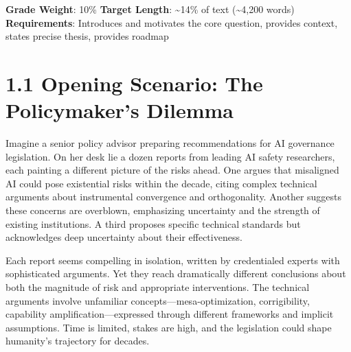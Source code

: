 \documentclass[
  11pt,
  letterpaper,
]{book}
\begin{document}
\begin{tcolorbox}[enhanced jigsaw, opacitybacktitle=0.6, colbacktitle=quarto-callout-note-color!10!white, toptitle=1mm, colback=white, breakable, left=2mm, bottomrule=.15mm, title=\textcolor{quarto-callout-note-color}{\faInfo}\hspace{0.5em}{Chapter Overview}, rightrule=.15mm, arc=.35mm, toprule=.15mm, opacityback=0, colframe=quarto-callout-note-color-frame, bottomtitle=1mm, titlerule=0mm, leftrule=.75mm, coltitle=black]

\textbf{Grade Weight}: 10\% \textbar{} \textbf{Target Length}:
\textasciitilde14\% of text (\textasciitilde4,200 words)\\
\textbf{Requirements}: Introduces and motivates the core question,
provides context, states precise thesis, provides roadmap

\end{tcolorbox}

\section*{1.1 Opening Scenario: The Policymaker's
Dilemma}\label{sec-opening-scenario}


\textcite{todd2024}

Imagine a senior policy advisor preparing recommendations for AI
governance legislation. On her desk lie a dozen reports from leading AI
safety researchers, each painting a different picture of the risks
ahead. One argues that misaligned AI could pose existential risks within
the decade, citing complex technical arguments about instrumental
convergence and orthogonality. Another suggests these concerns are
overblown, emphasizing uncertainty and the strength of existing
institutions. A third proposes specific technical standards but
acknowledges deep uncertainty about their effectiveness.

Each report seems compelling in isolation, written by credentialed
experts with sophisticated arguments. Yet they reach dramatically
different conclusions about both the magnitude of risk and appropriate
interventions. The technical arguments involve unfamiliar
concepts---mesa-optimization, corrigibility, capability
amplification---expressed through different frameworks and implicit
assumptions. Time is limited, stakes are high, and the legislation could
shape humanity's trajectory for decades.
\end{document}
